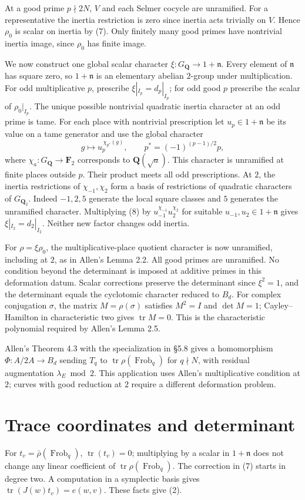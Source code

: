 \documentclass[11pt]{article}
\newcommand{\F}{\mathbf F_2}
\newcommand{\Q}{\mathbf Q}
\newcommand{\tr}{\operatorname{tr}}
\newcommand{\Fr}{\operatorname{Frob}}
\newcommand{\n}{\mathfrak n}
\begin{document}
At a good prime \(p\nmid 2N\), \(V\) and each Selmer cocycle are unramified. For a representative the inertia restriction is zero since inertia acts trivially on \(V\). Hence \(\rho_0\) is scalar on inertia by (7). Only finitely many good primes have nontrivial inertia image, since \(\rho_0\) has finite image.

We now construct one global scalar character \(\xi:G_\Q\to1+\n\). Every element of \(\n\) has square zero, so \(1+\n\) is an elementary abelian \(2\)-group under multiplication. For odd multiplicative \(p\), prescribe \(\xi|_{I_p}=d_p|_{I_p}\); for odd good \(p\) prescribe the scalar of \(\rho_0|_{I_p}\). The unique possible nontrivial quadratic inertia character at an odd prime is tame. For each place with nontrivial prescription let \(u_p\in1+\n\) be its value on a tame generator and use the global character
\[
 g\longmapsto u_p^{\,\chi_{p^*}(g)},\qquad
 p^*=(-1)^{(p-1)/2}p ,
\tag{8}
\]
where \(\chi_a:G_\Q\to\F\) corresponds to \(\Q(\sqrt a)\). This character is unramified at finite places outside \(p\). Their product meets all odd prescriptions. At \(2\), the inertia restrictions of \(\chi_{-1},\chi_2\) form a basis of restrictions of quadratic characters of \(G_{\Q_2}\). Indeed \(-1,2,5\) generate the local square classes and \(5\) generates the unramified character. Multiplying (8) by
\(u_{-1}^{\chi_{-1}}u_2^{\chi_2}\) for suitable \(u_{-1},u_2\in1+\n\) gives \(\xi|_{I_2}=d_2|_{I_2}\). Neither new factor changes odd inertia.

For \(\rho=\xi\rho_0\), the multiplicative-place quotient character is now unramified, including at \(2\), as in Allen's Lemma 2.2. All good primes are unramified. No condition beyond the determinant is imposed at additive primes in this deformation datum. Scalar corrections preserve the determinant since \(\xi^2=1\), and the determinant equals the cyclotomic character reduced to \(B_d\). For complex conjugation \(\sigma\), the matrix \(M=\rho(\sigma)\) satisfies \(M^2=I\) and \(\det M=1\); Cayley--Hamilton in characteristic two gives \(\tr M=0\). This is the characteristic polynomial required by Allen's Lemma 2.5.

Allen's Theorem 4.3 with the specialization in \S5.8 gives a homomorphism \(\Phi:A/2A\to B_d\) sending \(T_q\) to \(\tr\rho(\Fr_q)\) for \(q\nmid N\), with residual augmentation \(\lambda_E\bmod2\). This application uses Allen's multiplicative condition at \(2\); curves with good reduction at \(2\) require a different deformation problem.

\section{Trace coordinates and determinant}
For \(t_v=\bar\rho(\Fr_q)\), \(\tr(t_v)=0\); multiplying by a scalar in \(1+\n\) does not change any linear coefficient of \(\tr\rho(\Fr_q)\). The correction in (7) starts in degree two. A computation in a symplectic basis gives \(\tr(J(w)t_v)=e(w,v)\). These facts give (2).
\end{document}
